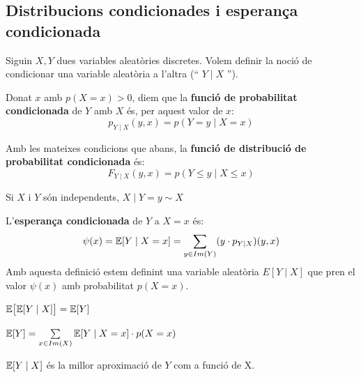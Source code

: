 \newpage

\subsection{Distribucions condicionades i esperança condicionada}
Siguin $X,Y$ dues variables aleatòries discretes. Volem definir la noció de condicionar una 
variable aleatòria a l'altra (`` $Y\mid X$ '').

\begin{defi}
  Donat $x$ amb $p(X=x)>0$, diem que la \textbf{funció de probabilitat condicionada} de $Y$ amb $X$ és, per aquest valor de $x$:
  \[
    p_{Y\mid X}(y,x) = p(Y=y\mid X=x)
  \]
\end{defi}

\begin{defi}
  Amb les mateixes condicions que abans, la \textbf{funció de distribució de probabilitat condicionada} és:
  \[
    F_{Y\mid X}(y,x) = p(Y\leq y \mid X \leq x)
  \]
\end{defi}

\begin{obs}
  Si $X$ i $Y$ són independents, $X\mid Y=y \sim X$
\end{obs}

\begin{defi}
  L'\textbf{esperança condicionada} de $Y$ a $X=x$ és: 
  \[
    \psi(x) = \mathbb{E}[Y\mid X=x] = \sum_{y\in Im(Y)}(y\cdot p_{Y\mid X})(y,x)
  \]
  Amb aquesta definició estem definint una variable aleatòria $E[Y\mid X]$ que pren el valor 
  $\psi(x)$ amb probabilitat $p(X=x)$.
\end{defi}

\begin{prop}
  $\mathbb{E}\big[\mathbb{E}[Y\mid X]\big] = \mathbb{E}[Y]$
\end{prop}

\begin{obs}
  $\mathbb{E}[Y] = \sum\limits_{x\in Im(X)}\mathbb{E}[Y\mid X=x]\cdot p(X=x)$
\end{obs}

\begin{obs}
  $\mathbb{E}[Y\mid X]$ és la millor aproximació de $Y$ com a funció de X.
\end{obs}

